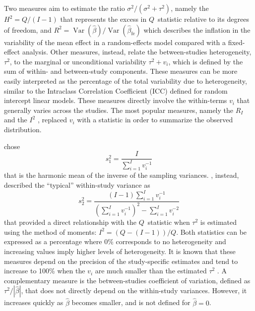 \documentclass[11pt,a4paper,twoside,openany]{book}\usepackage{knitr}
\DeclareMathOperator{\Var}{Var}
\begin{document}
{{\noindent Two measures aim to estimate the ratio $\sigma^2/(\sigma^2 + \tau^2)$, namely the $H^2= Q/(I-1)$ that represents the excess in $Q$~statistic relative to its degrees of freedom, and $R^2 = \Var\left(\hat \beta\right)/\Var\left(\hat \beta_{\text{fe}}\right)$ which describes the inflation in the variability of the mean effect in a random-effects model compared with a fixed-effect analysis.
Other measures, instead, relate the between-studies heterogeneity, $\tau^2$, to the marginal or unconditional variability $\tau^2 + v_i$, which is defined by the sum of within- and between-study components. These measures can be more easily interpreted as the percentage of the total variability due to heterogeneity, similar to the Intraclass Correlation Coefficient (ICC) defined for random intercept linear models. These measures directly involve the within-terms $v_i$ that generally varies across the studies. The most popular measures, namely the $R_I$ \citep{takkouche1999evaluation} and the $I^2$ \citep{higgins2002quantifying}, replaced $v_i$ with a statistic in order to summarize the observed distribution.

\noindent \cite{takkouche1999evaluation} chose
\begin{equation}
s_1^2 = \frac{I}{\sum_{i=1}^I v_i^{-1}}
\label{eq:Ri}
\end{equation}
\noindent that is the harmonic mean of the inverse of the sampling variances. 
\cite{higgins2002quantifying}, instead, described the ``typical'' within-study variance as
\begin{equation}
s_2^2 = \frac{(I-1) \sum_{i=1}^I v_i^{-1}}{ \left( \sum_{i=1}^I v_i^{-1} \right)^2 - \sum_{i=1}^I v_i^{-2}}
\label{eq:I2}
\end{equation}
\noindent that provided a direct relationship with the $Q$~statistic when $\tau^2$ is estimated using the method of moments: $I^2 = (Q - (I-1))/Q$.
\noindent Both statistics can be expressed as a percentage where 0\% corresponds to no heterogeneity and increasing values imply higher levels of heterogeneity. It is known that these measures depend on the precision of the study-specific estimates and tend to increase to 100\% when the $v_i$ are much smaller than the estimated $\tau^2$ \citep{takkouche1999evaluation, higgins2002quantifying}. 
A complementary measure is the between-studies coefficient of variation, defined as $\tau^2/|\hat \beta|$, that does not directly depend on the within-study variances. However, it increases quickly as $\hat \beta$ becomes smaller, and is not defined for $\hat \beta = 0$.



}}
\end{document}
